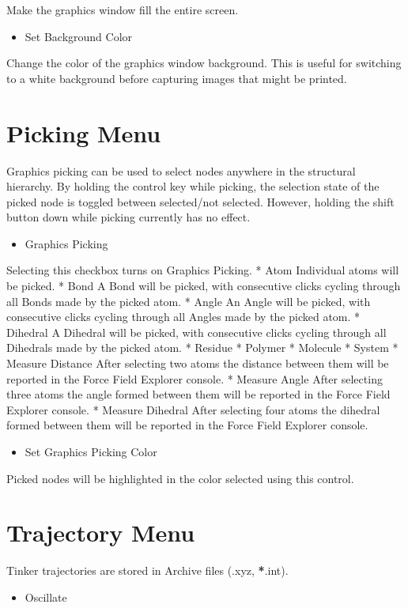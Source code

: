 \documentclass[letterpaper,11pt,english]{sphinxmanual}
\begin{document}
Make the graphics window fill the entire screen.
\begin{itemize}
\item {} 
Set Background Color

\end{itemize}

Change the color of the graphics window background. This is useful for switching to a white background before capturing images that might be printed.


\section{Picking Menu}
\label{\detokenize{text/menus:picking-menu}}
Graphics picking can be used to select nodes anywhere in the structural hierarchy. By holding the control key while picking, the selection state of the picked node is toggled between selected/not selected. However, holding the shift button down while picking currently has no effect.
\begin{itemize}
\item {} 
Graphics Picking

\end{itemize}

Selecting this checkbox turns on Graphics Picking.
* Atom
Individual atoms will be picked.
* Bond
A Bond will be picked, with consecutive clicks cycling through all Bonds made by the picked atom.
* Angle
An Angle will be picked, with consecutive clicks cycling through all Angles made by the picked atom.
* Dihedral
A Dihedral will be picked, with consecutive clicks cycling through all Dihedrals made by the picked atom.
* Residue
* Polymer
* Molecule
* System
* Measure Distance
After selecting two atoms the distance between them will be reported in the Force Field Explorer console.
* Measure Angle
After selecting three atoms the angle formed between them will be reported in the Force Field Explorer console.
* Measure Dihedral
After selecting four atoms the dihedral formed between them will be reported in the Force Field Explorer console.
\begin{itemize}
\item {} 
Set Graphics Picking Color

\end{itemize}

Picked nodes will be highlighted in the color selected using this control.


\section{Trajectory Menu}
\label{\detokenize{text/menus:trajectory-menu}}
Tinker trajectories are stored in Archive files (.xyz, {\color{red}\bfseries{}*}.int).
\begin{itemize}
\item {} 
Oscillate

\end{itemize}
\end{document}
